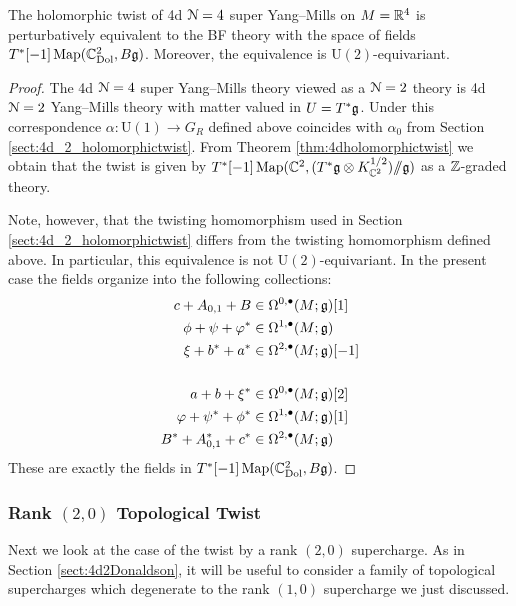 \documentclass[10pt, oneside]{article}
\renewcommand{\U}{\mathrm{U}}
\newcommand{\ham}{/\!\!/}
\begin{document}
\begin{theorem}
The holomorphic twist of 4d $\mathcal N=4$ super Yang--Mills on $M=\mathbb R^4$ is perturbatively equivalent to the BF theory with the space of fields $T^*[-1] \operatorname{Map}(\mathbb C^2_{\rm Dol} , B \mathfrak g)$. Moreover, the equivalence is $\U(2)$-equivariant.
\label{thm:4d4holomorphictwist}
\end{theorem}
\begin{proof}
The 4d $\mathcal N=4$ super Yang--Mills theory viewed as a $\mathcal N=2$ theory is 4d $\mathcal N=2$ Yang--Mills theory with matter valued in $U=T^*\mathfrak g$. Under this correspondence $\alpha\colon \U(1)\rightarrow G_R$ defined above coincides with $\alpha_0$ from Section \ref{sect:4d_2_holomorphictwist}. From Theorem \ref{thm:4dholomorphictwist} we obtain that the twist is given by $T^*[-1] \map(\CC^2 , (T^*\fg\otimes K_{\CC^2}^{1/2})\ham \fg)$ as a $\mathbb Z$-graded theory.

Note, however, that the twisting homomorphism used in Section \ref{sect:4d_2_holomorphictwist} differs from the twisting homomorphism defined above. In particular, this equivalence is not $\U(2)$-equivariant. In the present case the fields organize into the following collections:
\begin{align*}
c+A_{0, 1}+B&\in\Omega^{0, \bullet}(M; \mathfrak g)[1] \\
\phi + \psi + \varphi^*&\in\Omega^{1, \bullet}(M; \mathfrak g) \\
\xi + b^* + a^*&\in\Omega^{2, \bullet}(M; \mathfrak g)[-1] \\
\\
a + b + \xi^*&\in\Omega^{0, \bullet}(M; \mathfrak g)[2] \\
\varphi + \psi^* + \phi^* &\in\Omega^{1, \bullet}(M; \mathfrak g)[1] \\
B^*+A^*_{0, 1}+ c^*&\in\Omega^{2, \bullet}(M; \mathfrak g)
\end{align*}
These are exactly the fields in $T^*[-1] \operatorname{Map}(\mathbb C^2_{\rm Dol} , B \mathfrak g)$.
\end{proof}

\subsubsection{Rank \texorpdfstring{$(2,0)$}{(2,0)} Topological Twist}
\label{sect:4d4Atwist}

Next we look at the case of the twist by a rank $(2,0)$ supercharge. 
As in Section \ref{sect:4d2Donaldson}, it will be useful to consider a family of topological supercharges which degenerate to the rank $(1,0)$ supercharge we just discussed. 
\end{document}
